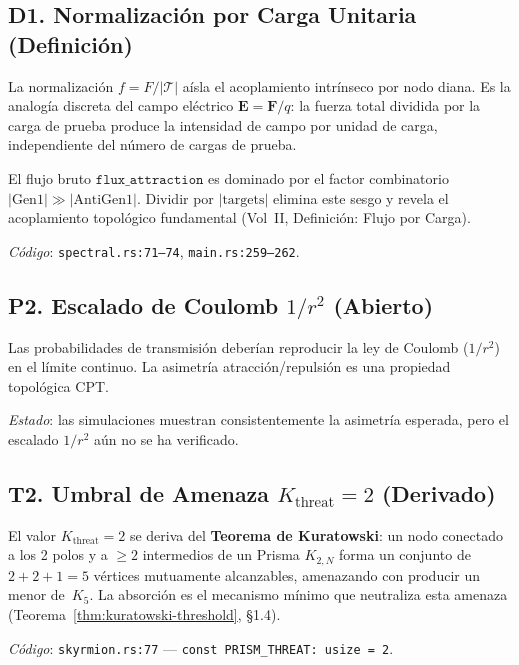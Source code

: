 \documentclass[11pt, a4paper, openany]{book}
\begin{document}
\subsection*{D1. Normalizaci\'on por Carga Unitaria (Definici\'on)}
\label{def-ref:flux-normalization}

La normalizaci\'on $f = F / |\mathcal{T}|$ a\'isla el acoplamiento
intr\'inseco por nodo diana. Es la analog\'ia discreta del campo
el\'ectrico $\mathbf{E} = \mathbf{F}/q$: la fuerza total dividida
por la carga de prueba produce la intensidad de campo por unidad de
carga, independiente del n\'umero de cargas de prueba.

El flujo bruto $\texttt{flux\_attraction}$ es dominado por el factor
combinatorio $|\text{Gen1}| \gg |\text{AntiGen1}|$. Dividir por
$|\text{targets}|$ elimina este sesgo y revela el acoplamiento
topol\'ogico fundamental (Vol~II, Definici\'on: Flujo por Carga).

\medskip\noindent
\textit{C\'odigo}: \texttt{spectral.rs:71--74},
\texttt{main.rs:259--262}.

\subsection*{P2. Escalado de Coulomb $1/r^2$ (Abierto)}
\label{open:coulomb-scaling}

Las probabilidades de transmisi\'on deber\'ian reproducir la ley de
Coulomb ($1/r^2$) en el l\'imite continuo. La asimetr\'ia
atracci\'on/repulsi\'on es una propiedad topol\'ogica CPT.

\medskip\noindent
\textit{Estado}: las simulaciones muestran consistentemente la
asimetr\'ia esperada, pero el escalado $1/r^2$ a\'un no se ha
verificado.

\subsection*{T2. Umbral de Amenaza $K_{\text{threat}} = 2$ (Derivado)}
\label{thm-ref:k-threat}

El valor $K_{\text{threat}} = 2$ se deriva del \textbf{Teorema de
Kuratowski}: un nodo conectado a los 2 polos y a $\geq 2$ intermedios
de un Prisma $K_{2,N}$ forma un conjunto de $2 + 2 + 1 = 5$ v\'ertices
mutuamente alcanzables, amenazando con producir un menor de~$K_5$. La
absorci\'on es el mecanismo m\'inimo que neutraliza esta amenaza
(Teorema~\ref{thm:kuratowski-threshold}, \S1.4).

\medskip\noindent
\textit{C\'odigo}: \texttt{skyrmion.rs:77} ---
\texttt{const PRISM\_THREAT: usize = 2}.
\end{document}
